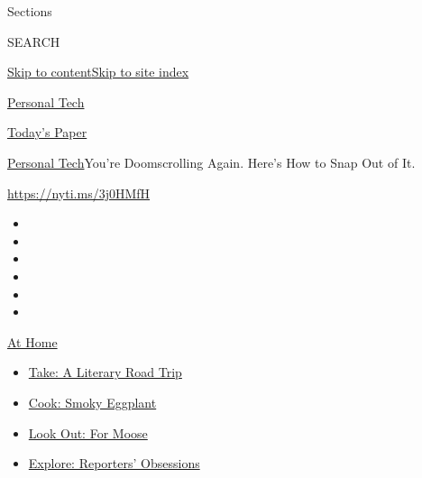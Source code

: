 Sections

SEARCH

\protect\hyperlink{site-content}{Skip to
content}\protect\hyperlink{site-index}{Skip to site index}

\href{https://www.nytimes3xbfgragh.onion/section/technology/personaltech}{Personal
Tech}

\href{https://myaccount.nytimes3xbfgragh.onion/auth/login?response_type=cookie\&client_id=vi}{}

\href{https://www.nytimes3xbfgragh.onion/section/todayspaper}{Today's
Paper}

\href{/section/technology/personaltech}{Personal Tech}\textbar{}You're
Doomscrolling Again. Here's How to Snap Out of It.

\url{https://nyti.ms/3j0HMfH}

\begin{itemize}
\item
\item
\item
\item
\item
\item
\end{itemize}

\href{https://www.nytimes3xbfgragh.onion/spotlight/at-home?action=click\&pgtype=Article\&state=default\&region=TOP_BANNER\&context=at_home_menu}{At
Home}

\begin{itemize}
\tightlist
\item
  \href{https://www.nytimes3xbfgragh.onion/2020/07/28/books/time-for-a-literary-road-trip.html?action=click\&pgtype=Article\&state=default\&region=TOP_BANNER\&context=at_home_menu}{Take:
  A Literary Road Trip}
\item
  \href{https://www.nytimes3xbfgragh.onion/2020/07/29/magazine/bored-with-your-home-cooking-some-smoky-eggplant-will-fix-that.html?action=click\&pgtype=Article\&state=default\&region=TOP_BANNER\&context=at_home_menu}{Cook:
  Smoky Eggplant}
\item
  \href{https://www.nytimes3xbfgragh.onion/2020/07/27/travel/moose-michigan-isle-royale.html?action=click\&pgtype=Article\&state=default\&region=TOP_BANNER\&context=at_home_menu}{Look
  Out: For Moose}
\item
  \href{https://www.nytimes3xbfgragh.onion/interactive/2020/at-home/even-more-reporters-editors-diaries-lists-recommendations.html?action=click\&pgtype=Article\&state=default\&region=TOP_BANNER\&context=at_home_menu}{Explore:
  Reporters' Obsessions}
\end{itemize}

